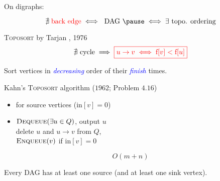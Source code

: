 
\begin{frame}
  \centerline{\large On digraphs:}
  \[
    \nexists\; \text{\red{back edge}} \iff \text{ DAG } \pause \iff \exists \text{ topo. ordering}
  \]

  \pause
  \begin{block}{\textsc{Toposort} by Tarjan , 1976}
    \vspace{0.30cm}
    \[
      \nexists \text{ cycle} \implies \textcolor{red}{\boxed{u \to v \iff \text{f}[v] < \text{f}[u]}}
    \]

    \pause
    \vspace{0.50cm}
    \centerline{Sort vertices in \textcolor{blue}{\emph{decreasing}} order of their \textcolor{blue}{\emph{finish}} times.}
  \end{block}
\end{frame}

\begin{frame}
  \begin{exampleblock}{Kahn's \textsc{Toposort} algorithm ($1962$; Problem $4.16$) }
    \begin{itemize}
      \setlength{\itemsep}{5pt}
      \item {} for source vertices ($\text{in}[v] = 0$)
      \item {} $\textsc{Dequeue}(\exists u \in Q)$, output $u$ \\[6pt]
	\hspace{1.3cm} delete $u$ and $u \to v$ from $Q$, \\[5pt]
	\hspace{1.3cm} $\textsc{Enqueue}(v)$ if $\text{in}[v] = 0$
    \end{itemize}
  \end{exampleblock}

  \pause
  \[
    O(m + n)
  \]

  \pause
  \begin{lemma}
    Every DAG has at least one source (and at least one sink vertex).
  \end{lemma}

  \pause
  \vspace{0.50cm}
  \centerline{}
\end{frame}

